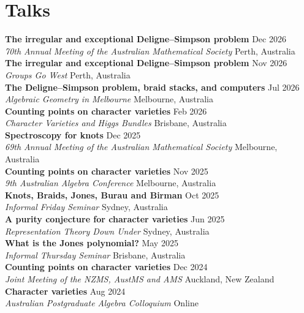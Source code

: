 \documentclass[8pt]{amsart}
\begin{document}
\section*{\LARGE Talks}
\textbf{The irregular and exceptional Deligne--Simpson problem} \hfill Dec 2026 \\
\emph{70th Annual Meeting of the Australian Mathematical Society} \hfill Perth, Australia \\
\textbf{The irregular and exceptional Deligne--Simpson problem} \hfill Nov 2026 \\
\emph{Groups Go West} \hfill Perth, Australia \\
\textbf{The Deligne--Simpson problem, braid stacks, and computers} \hfill Jul 2026 \\
\emph{Algebraic Geometry in Melbourne} \hfill Melbourne, Australia \\
\textbf{Counting points on character varieties} \hfill Feb 2026 \\
\emph{Character Varieties and Higgs Bundles} \hfill Brisbane, Australia \\
\textbf{Spectroscopy for knots} \hfill Dec 2025 \\
\emph{69th Annual Meeting of the Australian Mathematical Society} \hfill Melbourne, Australia \\
\textbf{Counting points on character varieties} \hfill Nov 2025 \\
\emph{9th Australian Algebra Conference} \hfill Melbourne, Australia \\
\textbf{Knots, Braids, Jones, Burau and Birman} \hfill Oct 2025 \\
\emph{Informal Friday Seminar} \hfill Sydney, Australia \\
\textbf{A purity conjecture for character varieties} \hfill Jun 2025 \\
\emph{Representation Theory Down Under} \hfill Sydney, Australia \\
\textbf{What is the Jones polynomial?} \hfill May 2025 \\
\emph{Informal Thursday Seminar} \hfill Brisbane, Australia \\
\textbf{Counting points on character varieties} \hfill Dec 2024 \\
\emph{Joint Meeting of the NZMS, AustMS and AMS} \hfill Auckland, New Zealand \\
\textbf{Character varieties} \hfill Aug 2024 \\
\emph{Australian Postgraduate Algebra Colloquium} \hfill Online \\
\end{document}
